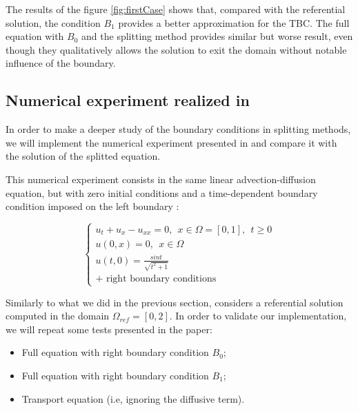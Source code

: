 \begin{minipage}{\textwidth}
\begin{minipage}{.5\linewidth}
	\end{minipage}
\end{minipage}

\indent The results of the figure \ref{fig:firstCase} shows that, compared with the referential solution, the condition $B_1$ provides a better approximation for the TBC. The full equation with $B_0$ and the splitting method provides similar but worse result, even though they qualitatively allows the solution to exit the domain without notable influence of the boundary.

\subsection{Numerical experiment realized in \cite{halpern1986}}

\indent In order to make a deeper study of the boundary conditions in splitting methods, we will implement the numerical experiment presented in \cite{halpern1986} and compare it with the solution of the splitted equation.

\indent This numerical experiment consists in the same linear advection-diffusion equation, but with zero initial conditions and a time-dependent boundary condition imposed on the left boundary :

\begin{equation}
	\label{eq:halpernProblem}
	\begin{cases}
	u_t + u_x - u_{xx} = 0, \ \ x \in \Omega = [0,1], \ \ t \ge 0  \\
	u(0,x) = 0, \ \ x \in \Omega \\
	u(t,0) = \frac{sin t}{\sqrt{t^2+1}} \\
	\text{+ right boundary conditions} 		
	\end{cases} 
\end{equation}

\indent Similarly to what we did in the previous section, \cite{halpern1986} considers a referential solution computed in the domain $
\Omega_{ref} = [0,2]$. In order to validate our implementation, we will repeat some tests presented in the paper: 

\begin{itemize}
	\item Full equation with right boundary condition $B_0$;
	\item Full equation with right boundary condition $B_1$;
	\item Transport equation (i.e, ignoring the diffusive term).
\end{itemize}

